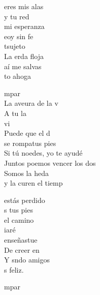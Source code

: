 \begin{cancion}%
	 eres mis alas\\
	 y tu red\\
	 mi esperanza\\
	 eoy sin fe\\
	tsujeto \\
	La erda floja\\
	 aí me salvas\\
	to ahoga\jump\\
	\begin{chorus}%
		mpar\\
		La aveura de la v\\
		A tu la\\
		vi \\
		Puede que el d\\
		se rompatus pies \\
		Si tú noedes, yo te ayudé \\
		Juntos poemos vencer los dos\\
		Somos la heda \\
		y la curen el tiemp \jump\\
	\end{chorus}%
	estás perdido\\
	 s tus pies\\
	 el camino\\
	 iaré\\
	  enseñastue\\
	De creer en \\
	Y sndo amigos\\
	s feliz.\jump\\
	\begin{chorus}%
		mpar\chord{mi}{m}{tir}\\

\end{chorus}
\end{cancion}
